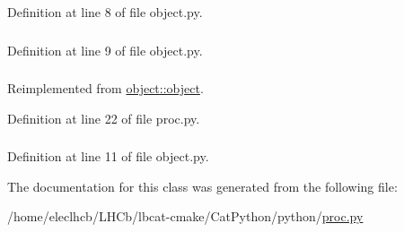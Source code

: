 Definition at line 8 of file object.py.\hypertarget{classobject_1_1object_a15f13858ecdbf661a97a7da93d717922}{
\subsubsection[{obj}]{}}
\label{classobject_1_1object_a15f13858ecdbf661a97a7da93d717922}


Definition at line 9 of file object.py.\hypertarget{classproc_1_1proc_a9ee372f307278c50a935b46ca00a350a}{
\subsubsection[{panel}]{}}
\label{classproc_1_1proc_a9ee372f307278c50a935b46ca00a350a}


Reimplemented from \hyperlink{classobject_1_1object_add82cb657066d4ab5b39035792971503}{object::object}.

Definition at line 22 of file proc.py.\hypertarget{classobject_1_1object_a6b4e1fd053496eafff2bc0f8aed7f089}{
\subsubsection[{path}]{}}
\label{classobject_1_1object_a6b4e1fd053496eafff2bc0f8aed7f089}


Definition at line 11 of file object.py.

The documentation for this class was generated from the following file:\begin{DoxyCompactItemize}
\item 
/home/eleclhcb/LHCb/lbcat-\/cmake/CatPython/python/\hyperlink{proc_8py}{proc.py}\end{DoxyCompactItemize}
